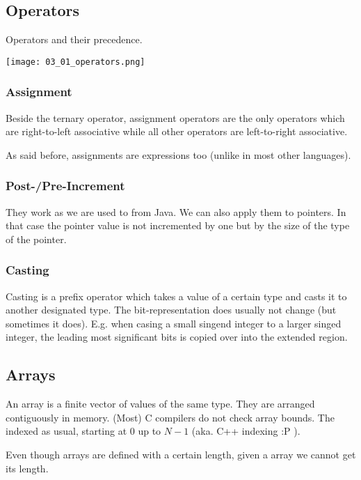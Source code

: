 

\subsection*{Operators}
Operators and their precedence.

\texttt{[image: 03\_01\_operators.png]}

\subsubsection{Assignment}
Beside the ternary operator, assignment operators are the only operators which are right-to-left associative while all other operators are left-to-right associative.

As said before, assignments are expressions too (unlike in most other languages).

\subsubsection{Post-/Pre-Increment}
They work as we are used to from Java. We can also apply them to pointers. In that case the pointer value is not incremented by one but by the size of the type of the pointer.

\subsubsection{Casting}
Casting is a prefix operator  which takes a value of a certain type and casts it to another designated type. The bit-representation does usually not change (but sometimes it does). E.g. when casing a small singend integer to a larger singed integer, the leading most significant bits is copied over into the extended region.

\subsection*{Arrays}
An array is a finite vector of values of the same type. They are arranged contiguously in memory. (Most) C compilers do not check array bounds. The indexed as usual, starting at $0$ up to $N-1$ (aka. C++ indexing :P ).

Even though arrays are defined with a certain length, given a array we cannot get its length.

